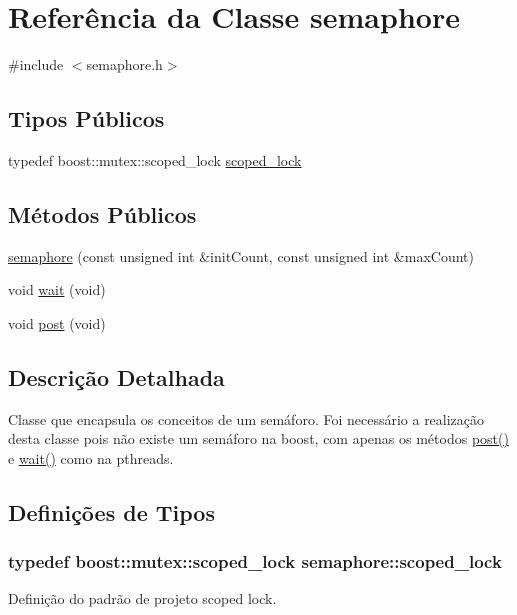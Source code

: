 \hypertarget{classsemaphore}{
\section{Referência da Classe semaphore}
\label{classsemaphore}
}


{\ttfamily \#include $<$semaphore.h$>$}

\subsection*{Tipos Públicos}
\begin{DoxyCompactItemize}
\item 
typedef boost::mutex::scoped\_\-lock \hyperlink{classsemaphore_ad4d360a8eabfead011d7ce5394c4dd2a}{scoped\_\-lock}
\end{DoxyCompactItemize}
\subsection*{Métodos Públicos}
\begin{DoxyCompactItemize}
\item 
\hyperlink{classsemaphore_a77d85322407545b8ccc4a85b920d90c1}{semaphore} (const unsigned int \&initCount, const unsigned int \&maxCount)
\item 
void \hyperlink{classsemaphore_af0e430d192c44be1d65f5a4fd8cb91a4}{wait} (void)
\item 
void \hyperlink{classsemaphore_a14c3b9f4312c43d9400905c938752665}{post} (void)
\end{DoxyCompactItemize}


\subsection{Descrição Detalhada}
Classe que encapsula os conceitos de um semáforo. Foi necessário a realização desta classe pois não existe um semáforo na boost, com apenas os métodos \hyperlink{classsemaphore_a14c3b9f4312c43d9400905c938752665}{post()} e \hyperlink{classsemaphore_af0e430d192c44be1d65f5a4fd8cb91a4}{wait()} como na pthreads. 

\subsection{Definições de Tipos}
\hypertarget{classsemaphore_ad4d360a8eabfead011d7ce5394c4dd2a}{
\subsubsection[{scoped\_\-lock}]{\setlength{\rightskip}{0pt plus 5cm}typedef boost::mutex::scoped\_\-lock {\bf semaphore::scoped\_\-lock}}}
\label{classsemaphore_ad4d360a8eabfead011d7ce5394c4dd2a}
Definição do padrão de projeto scoped lock. 

